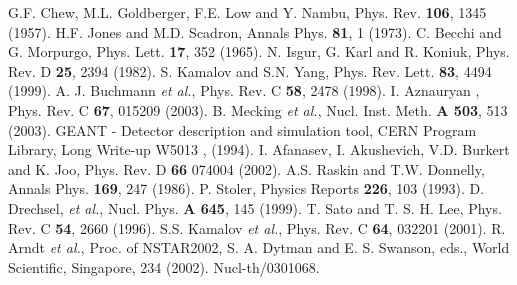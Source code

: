 \documentclass[aps,prl,twocolumn,superscriptaddress]{revtex4}
\begin{document}
\begin{thebibliography}{99}
              {G.F. Chew, M.L. Goldberger, F.E. Low and Y. Nambu},     {\aaa Phys. Rev.        }        {\bf 106},             1345   (1957).
     {H.F. Jones and M.D. Scadron},                           {\aaa Annals Phys.      }        {\bf 81},                 1   (1973).
          {C. Becchi and G. Morpurgo},                             {\aaa Phys. Lett.       }        {\bf 17},               352   (1965).
             {N. Isgur, G. Karl and R. Koniuk},                       {\aaa Phys. Rev.        }      D {\bf 25},              2394   (1982).
      {S. Kamalov and S.N. Yang},                              {\aaa Phys. Rev. Lett.  }        {\bf 83},              4494   (1999).
              {A. J. Buchmann {\it et al.}},                           {\aaa Phys. Rev.        }      C {\bf 58},              2478   (1998).
              {I. Aznauryan },                                         {\aaa Phys. Rev.        }      C {\bf 67},            015209   (2003).
              {B. Mecking {\it et al.}},                               {\aaa Nucl. Inst. Meth. }        {\bf A 503},            513   (2003).
             {GEANT - Detector description and simulation tool, CERN Program Library},                 {\aaa Long Write-up W5013 },  (1994).
           {I. Afanasev, I. Akushevich, V.D. Burkert and K. Joo},   {\aaa Phys. Rev.        }      D {\bf 66}             074004   (2002).
            {A.S. Raskin and T.W. Donnelly},                         {\aaa Annals Phys.      }        {\bf 169},              247   (1986).
   {P. Stoler},                                             {\aaa Physics Reports   }        {\bf 226},              103   (1993).
              {D. Drechsel,  {\it et al.}},                            {\aaa Nucl. Phys.       }        {\bf A 645},            145   (1999).
          {T. Sato and T. S. H. Lee},                              {\aaa Phys. Rev.        }      C {\bf 54},              2660   (1996).
               {S.S. Kamalov {\it et al.}},                             {\aaa Phys. Rev.        }      C {\bf 64},            032201   (2001).
              {R. Arndt {\it et al.}},                                 {\aaa Proc. of NSTAR2002}, S. A. Dytman and E. S. Swanson, eds., World Scientific, Singapore,   234   (2002).  Nucl-th/0301068.

\end{thebibliography}
\end{document}
